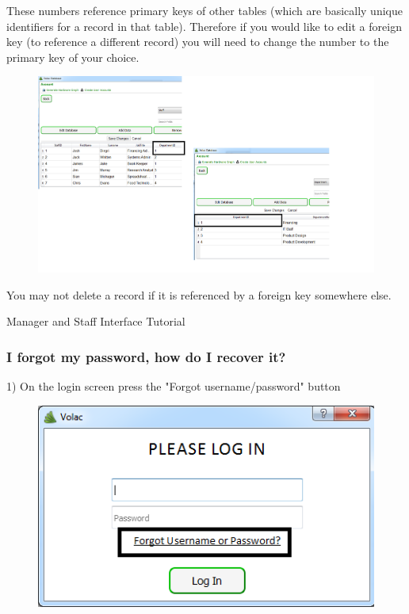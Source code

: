 These numbers reference primary keys of other tables (which are basically unique identifiers for a record in that table). Therefore if you would like to edit a foreign key (to reference a different record) you will need to change the number to the primary key of your choice.

\begin{figure}[H]
    \includegraphics[width=\textwidth]{./Manual/Images/foreign2.png}
\end{figure}

You may not delete a record if it is referenced by a foreign key somewhere else.

Manager and Staff Interface Tutorial

\subsubsection{I forgot my password, how do I recover it?}

1) On the login screen press the "Forgot username/password" button

\begin{figure}[H]
    \includegraphics[width=\textwidth]{./Manual/Images/forgot.png}
\end{figure}

